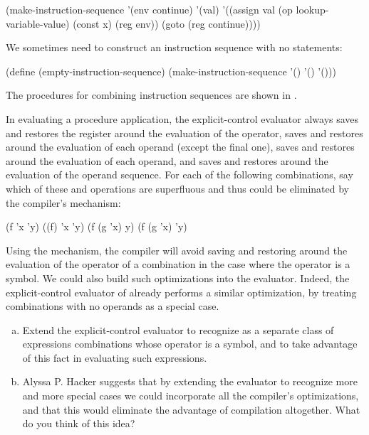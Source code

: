 \begin{codeBlock}
(make-instruction-sequence
  '(env continue)
  '(val)
  '((assign val
            (op lookup-variable-value)
            (const x)
            (reg env))
    (goto (reg continue))))
\end{codeBlock}

\noindent
We sometimes need to construct an instruction sequence with no statements:

\begin{codeBlock}
(define (empty-instruction-sequence)
  (make-instruction-sequence '() '() '()))
\end{codeBlock}

\noindent
The procedures for combining instruction sequences are shown in
.

\begin{exerciseGroup}
\label{Exercise 5.31}
 In evaluating a procedure
application, the explicit-control evaluator always saves and restores the
 register around the evaluation of the operator, saves and restores
 around the evaluation of each operand (except the final one), saves
and restores  around the evaluation of each operand, and saves and
restores  around the evaluation of the operand sequence.  For each
of the following combinations, say which of these  and
 operations are superfluous and thus could be eliminated by the
compiler's  mechanism:

\begin{codeBlock}
(f 'x 'y)
((f) 'x 'y)
(f (g 'x) y)
(f (g 'x) 'y)
\end{codeBlock}

\label{Exercise 5.32}
 Using the 
mechanism, the compiler will avoid saving and restoring  around the
evaluation of the operator of a combination in the case where the operator is a
symbol.  We could also build such optimizations into the evaluator.  Indeed,
the explicit-control evaluator of  already performs a similar
optimization, by treating combinations with no operands as a special case.

\begin{enumerate}[a.]

\item
Extend the explicit-control evaluator to recognize as a separate class of
expressions combinations whose operator is a symbol, and to take advantage of
this fact in evaluating such expressions.

\item
Alyssa P. Hacker suggests that by extending the evaluator to recognize more and
more special cases we could incorporate all the compiler's optimizations, and
that this would eliminate the advantage of compilation altogether.  What do you
think of this idea?

\end{enumerate}
\end{exerciseGroup}

